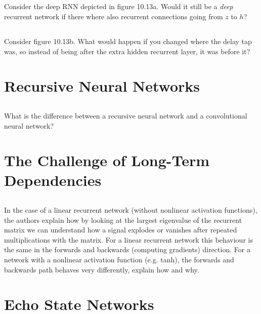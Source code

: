 \documentclass[a4paper]{report}
\begin{document}
    \subsection{}
    Consider the deep RNN depicted in figure 10.13a. Would it still be a \emph{deep} recurrent network if there where also recurrent connections going from $z$ to $h$?
    \subsection{}
    Consider figure 10.13b. What would happen if you changed where the delay tap was, so instead of being after the extra hidden recurrent layer, it was before it?

    \section{Recursive Neural Networks}
    \subsection{}
    What is the difference between a recursive neural network and a convolutional neural network?

    \section{The Challenge of Long-Term Dependencies}
    \subsection{}
    In the case of a linear recurrent network (without nonlinear activation functions), the authors explain how by looking at the largest eigenvalue of the recurrent matrix we can understand how a signal explodes or vanishes after repeated multiplications with the matrix. For a linear recurrent network this behaviour is the same in the forwards and backwards (computing gradients) direction. For a network with a nonlinear activation function (e.g. tanh), the forwards and backwards path behaves very differently, explain how and why.

    \section{Echo State Networks}
\end{document}

